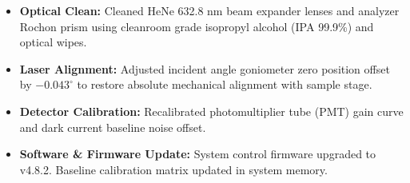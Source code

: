 \documentclass[10pt,a4paper]{scrartcl}
\begin{document}
\begin{tcolorbox}[sectionbox, title={\faTools\ SECTION 6: MAINTENANCE, ADJUSTMENTS \& ACTION ITEMS}]
\small
\begin{itemize}[leftmargin=12pt, topsep=1pt, itemsep=2pt, parsep=0pt]
  \item \textbf{Optical Clean:} Cleaned HeNe 632.8 nm beam expander lenses and analyzer Rochon prism using cleanroom grade isopropyl alcohol (IPA 99.9\%) and optical wipes.
  \item \textbf{Laser Alignment:} Adjusted incident angle goniometer zero position offset by $-0.043^\circ$ to restore absolute mechanical alignment with sample stage.
  \item \textbf{Detector Calibration:} Recalibrated photomultiplier tube (PMT) gain curve and dark current baseline noise offset.
  \item \textbf{Software \& Firmware Update:} System control firmware upgraded to v4.8.2. Baseline calibration matrix updated in system memory.
\end{itemize}
\end{tcolorbox}

\vspace{1pt}
\end{document}
